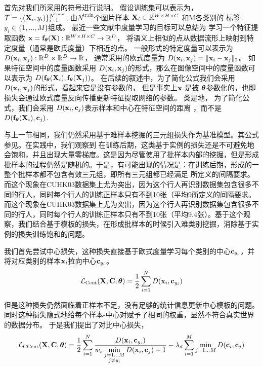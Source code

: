 首先对我们所采用的符号进行说明。
假设训练集可以表示为，$\mathcal{T}=\{({\mathbf{X}}_i,y_i)\}_{i=1}^{N^{\textrm{train}}}$, 由$N^{\textrm{train}}$个图片样本
${\mathbf{X}}_i \in {\mathbb{R}}^{W\times H\times C}$
和M各类别的
标签$y_i \in \{1,\dots, M\}$组成。
最近一些文献中度量学习的目标可以总结为
学习一个特征提取函数
${\mathbf{x}} = {\mathbf{f}}_{\boldsymbol{\theta}} ({\mathbf{X}}): {\mathbb{R}}^{W \times H\times C} \rightarrow \mathbb{R}^D$，
将语义上相似的点从数据流形上映射到特定度量（通常是欧氏度量）下相近的点。
一般形式的特定度量可以表示为$D( {\mathbf{x}}_i, {\mathbf{x}}_j):\mathbb{R}^D \times \mathbb{R}^D \rightarrow \mathbb{R}$，
通常采用的欧式度量为
$D({\mathbf{x}}_i,{\mathbf{x}}_j)=\|{\mathbf{x}}_i - {\mathbf{x}}_j\|_2$。
如果特征空间中的度量函数采用
$D({\mathbf{x}}_i,  {\mathbf{x}}_j)$的形式，那么在图像空间中的度量函数可以表示为
$D({\mathbf{f}}_{\boldsymbol{\theta}}({\mathbf{X}}_i), {\mathbf{f}}_{\boldsymbol{\theta}}({\mathbf{X}}_j))$。
在后续的叙述中，为了简化公式我们会采用$D({\mathbf{x}}_i,  {\mathbf{x}}_j)$的形式，看起来它是没有参数的，
但是事实上${\mathbf{x}}$ 是被 ${\boldsymbol{\theta}}$参数化的，也即损失会通过欧式度量反向传播更新特征提取网络的参数。
类是地，
为了简化公式，我们会采用
$D({\mathbf{x}}_i,{\mathbf{c}}_j)$表示样本和中心在特征空间的距离
，而不是$D({\mathbf{f}}_{\boldsymbol{\theta}}({\mathbf{X}}_i), {\mathbf{c}}_j)$.

与上一节\misscite 相同，我们仍然采用基于难样本挖掘的三元组损失作为基准模型。其公式参见\misscite 。在实践中，我们观察到
在训练后期，这类基于实例的损失还是不可避免地会饱和，并且出现大量零梯度。这是因为尽管使用了批样本内部的挖掘，但是形成批样本的过程仍然是随机的。于是，有可能出现的情况是：在训练后期，形成的一整个批样本都不包含有效三元组，即所有三元组都已经满足 
\misscite  
所定义的间隔要求。而这个现象在CUHK03数据集上尤为突出，因为这个行人再识别数据集包含很多不同的行人，同时每个行人的训练正样本只有不到10张（平均9所定义的间隔要求。而这个现象在CUHK03数据集上尤为突出，因为这个行人再识别数据集包含很多不同的行人，同时每个行人的训练正样本只有不到10张（平均9.4张）。基于这个观察，我们结合基于模板的损失，在形成批样本的时候引入难类别挖掘，消除基于实例的损失训练饱和的问题。

我们首先尝试中心损失，这种损失直接基于欧式度量学习每个类别的中心${\mathbf{c}}_{y_i}$，并将对应类别的样本${\mathbf{x}}_i$拉向中心${\mathbf{c}}_{y_i}$。
\begin{equation}
	\mathcal{L}_{\textrm{Cent}} ({\mathbf{X}}, {\mathbf{C}}, {\boldsymbol{\theta}}) = \frac{1}{2}
	\sum_{i=1}^{N}  D(
	{\mathbf{x}}_i , {\mathbf{c}}_{y_i} )
\end{equation}

但是这种损失仍然面临着正样本不足，没有足够的统计信息更新中心模板的问题。
同时这种损失隐式地给每个样本-中心对赋予了相同的权重，显然不符合真实世界的数据分布。
于是我们提出了对比中心损失，
\begin{equation}
	\mathcal{L}_{\textrm{CCent}} ({\mathbf{X}}, {\mathbf{C}}, {\boldsymbol{\theta}}) = \frac{1}{2}
	\sum_{i=1}^{N}
	\frac{D(
		{\mathbf{x}}_{i}, {\mathbf{c}}_{y_i}
		)}{ 
			\displaystyle w_s
			\min_{\substack{
				j=1...M \\
				j \neq y_i }}
		D(
		{\mathbf{x}}_{i}, {\mathbf{c}}_{j}
		) + 1 }
	-
	\lambda_d \sum_{i=1}^{M}  \min_{j=1...M} D({\mathbf{c}}_i,{\mathbf{c}}_j)
\end{equation}

